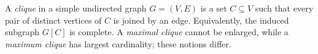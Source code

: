 
A \emph{clique} in a simple undirected graph $G=(V,E)$ is a set $C\subseteq V$ such that every pair of distinct vertices of $C$ is joined by an edge. Equivalently, the induced subgraph $G[C]$ is complete. A \emph{maximal clique} cannot be enlarged, while a \emph{maximum clique} has largest cardinality; these notions differ.
